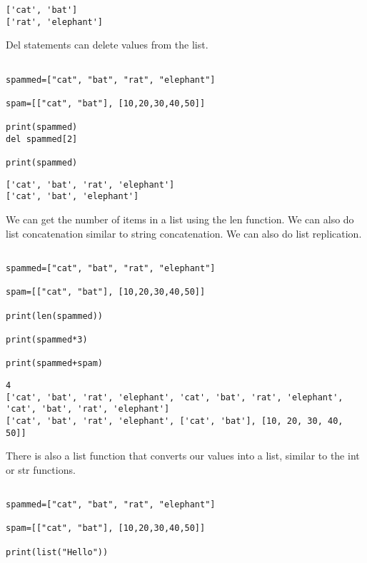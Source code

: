 \documentclass[11pt]{article}
\begin{document}
\begin{verbatim}
['cat', 'bat']
['rat', 'elephant']
\end{verbatim}


Del statements can delete values from the list.

\begin{verbatim}

spammed=["cat", "bat", "rat", "elephant"]

spam=[["cat", "bat"], [10,20,30,40,50]]

print(spammed)
del spammed[2]

print(spammed)

\end{verbatim}

\begin{verbatim}
['cat', 'bat', 'rat', 'elephant']
['cat', 'bat', 'elephant']
\end{verbatim}


We can get the number of items in a list using the len function. We can also do list concatenation similar to string concatenation. We can also do list replication.

\begin{verbatim}

spammed=["cat", "bat", "rat", "elephant"]

spam=[["cat", "bat"], [10,20,30,40,50]]

print(len(spammed))

print(spammed*3)

print(spammed+spam)

\end{verbatim}

\begin{verbatim}
4
['cat', 'bat', 'rat', 'elephant', 'cat', 'bat', 'rat', 'elephant', 'cat', 'bat', 'rat', 'elephant']
['cat', 'bat', 'rat', 'elephant', ['cat', 'bat'], [10, 20, 30, 40, 50]]
\end{verbatim}


There is also a list function that converts our values into a list, similar to the int or str functions.

\begin{verbatim}

spammed=["cat", "bat", "rat", "elephant"]

spam=[["cat", "bat"], [10,20,30,40,50]]

print(list("Hello"))

\end{verbatim}
\end{document}
